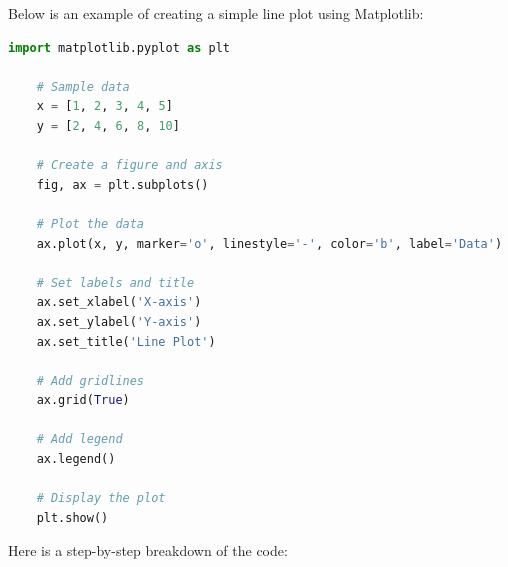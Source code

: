Below is an example of creating a simple line plot using Matplotlib:

\begin{lstlisting}[language=Python]
	import matplotlib.pyplot as plt
	
	# Sample data
	x = [1, 2, 3, 4, 5]
	y = [2, 4, 6, 8, 10]
	
	# Create a figure and axis
	fig, ax = plt.subplots()
	
	# Plot the data
	ax.plot(x, y, marker='o', linestyle='-', color='b', label='Data')
	
	# Set labels and title
	ax.set_xlabel('X-axis')
	ax.set_ylabel('Y-axis')
	ax.set_title('Line Plot')
	
	# Add gridlines
	ax.grid(True)
	
	# Add legend
	ax.legend()
	
	# Display the plot
	plt.show()
\end{lstlisting}

Here is a step-by-step breakdown of the code:

